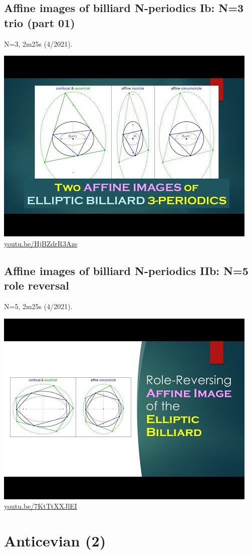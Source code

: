 \documentclass[12pt]{amsart}
\begin{document}
\subsection{Affine images of billiard N-periodics Ib: N=3 trio (part 01)}
\label{vid:HjBZdrR3Azs}
\noindent N=3, 2m25s (4/2021). 
\begin{center}\includegraphics[width=.5\textwidth]{pics/HjBZdrR3Azs.jpg} \\ 
\href{https://youtu.be/HjBZdrR3Azs}{\url{youtu.be/HjBZdrR3Azs}}\end{center}
% 

\subsection{Affine images of billiard N-periodics IIb: N=5 role reversal}
\label{vid:7KtTtXXJlEI}
\noindent N=5, 2m25s (4/2021). 
\begin{center}\includegraphics[width=.5\textwidth]{pics/7KtTtXXJlEI.jpg} \\ 
\href{https://youtu.be/7KtTtXXJlEI}{\url{youtu.be/7KtTtXXJlEI}}\end{center}
% 


\section{Anticevian (2)}
\end{document}
